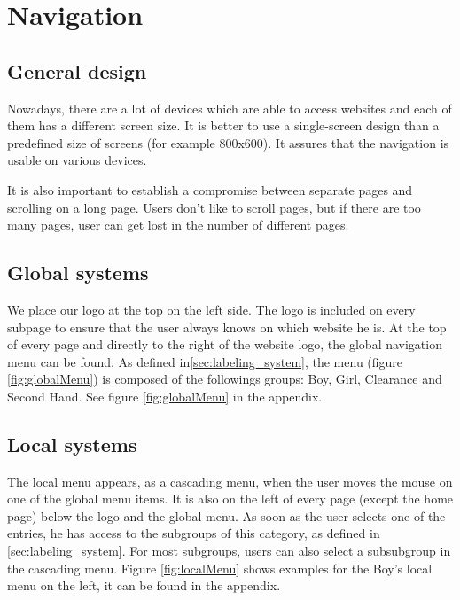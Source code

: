 \section{Navigation}

\subsection{General design}

Nowadays, there are a lot of devices which are able to access websites and each of them has a different screen size. It is better to use a single-screen design than a predefined size of screens (for example 800x600). It assures that the navigation is usable on various devices. 

It is also important to establish a compromise between separate pages and scrolling on a long page. Users don't like to scroll pages, but if there are too many pages, user can get lost in the number of different pages.

\subsection{Global systems}

We place our logo at the top on the left side. The logo is included on every subpage to ensure that the user always knows on which website he is.
At the top of every page and directly to the right of the website logo, the global navigation menu can be found. As defined in\ref{sec:labeling_system}, the menu (figure \ref{fig:globalMenu}) is composed of the followings groups: Boy, Girl, Clearance and Second Hand. See figure \ref{fig:globalMenu} in the appendix.

\subsection{Local systems}\label{sec:local_systems}
The local menu appears, as a cascading menu, when the user moves the mouse on one of the global menu items. It is also on the left of every page (except the home page) below the logo and the global menu. As soon as the user selects one of the entries, he has access to the subgroups of this category, as defined in \ref{sec:labeling_system}. For most subgroups, users can also select a subsubgroup in the cascading menu. Figure \ref{fig:localMenu} shows examples for the Boy's local menu on the left, it can be found in the appendix.

